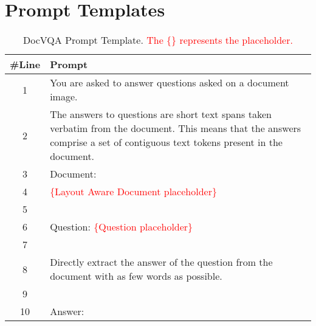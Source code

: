 \documentclass[letterpaper]{article} \usepackage{aaai24_preprint}  \usepackage{times}  \usepackage{helvet}  \usepackage{courier}  \usepackage[hyphens]{url}  \usepackage{graphicx} \urlstyle{rm} \def\UrlFont{\rm}  \usepackage{natbib}  \usepackage{caption} \frenchspacing  \setlength{\pdfpagewidth}{8.5in} \setlength{\pdfpageheight}{11in} \usepackage{algorithm}
\begin{document}
\section{Prompt Templates}
\begin{table*}[ht]
    \small
    \centering
    \begin{tabular}{cl}
    \toprule
    \#Line& Prompt\\
    \midrule
    1& You are asked to answer questions asked on a document image.\\
    2& \parbox[c]{16cm}{
    The answers to questions are short text spans taken verbatim from the document.
    This means that the answers comprise a set of contiguous text tokens present in the document.}\\
    3& Document:\\
    4& \textcolor{red}{\{Layout Aware Document placeholder\}}\\
    5& \\
    6& Question: \textcolor{red}{\{Question placeholder\}}\\
    7&\\
    8&Directly extract the answer of the question from the document with as few words as possible.\\
    9&\\
    10&Answer:\\
    \bottomrule
\end{tabular}
\caption{DocVQA Prompt Template. \textcolor{red}{The \{\} represents the placeholder.}}
\label{tab:docvqa_prompt}
\end{table*}
\end{document}
